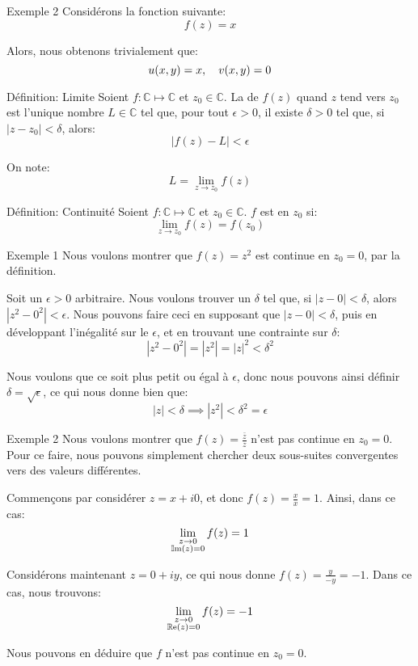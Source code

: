 \documentclass[a4paper]{article}
\begin{document}
\begin{parag}{Exemple 2}
    Considérons la fonction suivante: 
    \[f\left(z\right) = x\]
    
    Alors, nous obtenons trivialement que: 
    \[u\left(x, y\right) = x, \mathspace v\left(x, y\right) = 0\]
\end{parag}

\begin{parag}{Définition: Limite}
    Soient $f: \mathbb{C} \mapsto \mathbb{C}$ et $z_0 \in \mathbb{C}$. La  de $f\left(z\right)$ quand $z$ tend vers $z_0$ est l'unique nombre $L \in \mathbb{C}$ tel que, pour tout $\epsilon > 0$, il existe $\delta > 0$ tel que, si $\left|z - z_0\right| < \delta$, alors: 
    \[\left|f\left(z\right) - L\right| < \epsilon\]

    On note: 
    \[L = \lim_{z \to z_0} f\left(z\right)\]
\end{parag}

\begin{parag}{Définition: Continuité}
    Soient $f: \mathbb{C} \mapsto \mathbb{C}$ et $z_0 \in \mathbb{C}$. $f$ est  en $z_0$ si: 
    \[\lim_{z \to z_0} f\left(z\right) = f\left(z_0\right)\]
\end{parag}

\begin{parag}{Exemple 1}
    Nous voulons montrer que $f\left(z\right) = z^2$ est continue en $z_0 = 0$, par la définition.

    Soit un $\epsilon > 0$ arbitraire. Nous voulons trouver un $\delta$ tel que, si $\left|z - 0\right| < \delta$, alors $\left|z^2 - 0^2\right| < \epsilon$. Nous pouvons faire ceci en supposant que $\left|z - 0\right| < \delta$, puis en développant l'inégalité sur le $\epsilon$, et en trouvant une contrainte sur $\delta$: 
    \[\left|z^2 - 0^2\right| = \left|z^2\right| = \left|z\right|^2 < \delta ^2\]
    
    Nous voulons que ce soit plus petit ou égal à $\epsilon$, donc nous pouvons ainsi définir $\delta = \sqrt{\epsilon}$, ce qui nous donne bien que:
    \[\left|z\right| < \delta \implies\left|z^2\right| < \delta ^2 = \epsilon\]
\end{parag}

\begin{parag}{Exemple 2}
    Nous voulons montrer que $f\left(z\right) = \frac{\bar{z}}{z}$ n'est pas continue en $z_0 = 0$. Pour ce faire, nous pouvons simplement chercher deux sous-suites convergentes vers des valeurs différentes. 

    Commençons par considérer $z = x + i0$, et donc $f\left(z\right) = \frac{x}{x} = 1$. Ainsi, dans ce cas:
    \[\lim_{\substack{z \to 0 \\ \cim\left(z\right) = 0}} f\left(z\right) = 1\]

    Considérons maintenant $z = 0 + iy$, ce qui nous donne $f\left(z\right) = \frac{y}{-y} = -1$. Dans ce cas, nous trouvons:
    \[\lim_{\substack{z \to 0 \\ \cre\left(z\right) = 0}} f\left(z\right) = -1\]

    Nous pouvons en déduire que $f$ n'est pas continue en $z_0 = 0$.
\end{parag}
\end{document}
